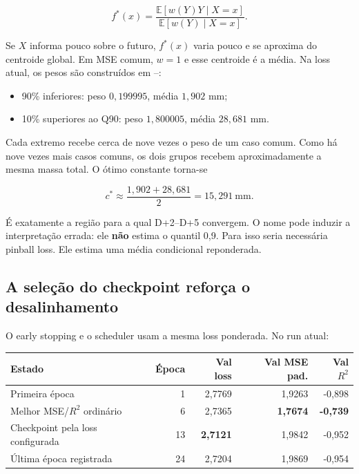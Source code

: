 \documentclass[11pt,a4paper]{article}
\newcommand{\code}[1]{\texttt{\detokenize{#1}}}
\begin{document}
\[
f^*(x)=\frac{\mathbb{E}[w(Y)Y\mid X=x]}{\mathbb{E}[w(Y)\mid X=x]}.
\]

Se $X$ informa pouco sobre o futuro, $f^*(x)$ varia pouco e se aproxima do centroide global.
Em MSE comum, $w=1$ e esse centroide é a média. Na loss atual, os pesos são construídos em
--:

\begin{itemize}
  \item 90\% inferiores: peso $0{,}199995$, média $1{,}902$ mm;
  \item 10\% superiores ao Q90: peso $1{,}800005$, média $28{,}681$ mm.
\end{itemize}

Cada extremo recebe cerca de nove vezes o peso de um caso comum. Como há nove vezes mais casos
comuns, os dois grupos recebem aproximadamente a mesma massa total. O ótimo constante torna-se

\[
c^*\approx\frac{1{,}902+28{,}681}{2}=15{,}291\ \text{mm}.
\]

É exatamente a região para a qual D+2--D+5 convergem. O nome
\code{quantile_mse} pode induzir a interpretação errada: ele \textbf{não} estima o quantil 0,9.
Para isso seria necessária pinball loss. Ele estima uma média condicional reponderada.

\subsection{A seleção do checkpoint reforça o desalinhamento}

O early stopping e o scheduler usam a mesma loss ponderada. No run atual:

\begin{center}
\begin{tabular}{@{}lrrrr@{}}
\toprule
\textbf{Estado} & \textbf{Época} & \textbf{Val loss} & \textbf{Val MSE pad.} & \textbf{Val $R^2$} \\
\midrule
Primeira época & 1 & 2,7769 & 1,9263 & -0,898 \\
Melhor MSE/$R^2$ ordinário & 6 & 2,7365 & \textbf{1,7674} & \textbf{-0,739} \\
Checkpoint pela loss configurada & 13 & \textbf{2,7121} & 1,9842 & -0,952 \\
Última época registrada & 24 & 2,7204 & 1,9869 & -0,954 \\
\bottomrule
\end{tabular}
\end{center}
\end{document}
